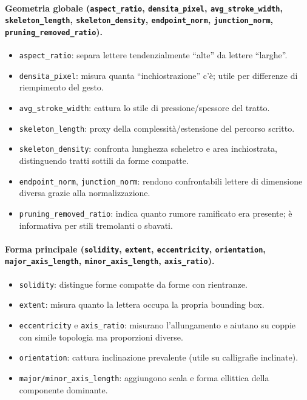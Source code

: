 \documentclass[a4paper,12pt]{article}
\begin{document}
\paragraph{Geometria globale (\texttt{aspect\_ratio}, \texttt{densita\_pixel}, \texttt{avg\_stroke\_width}, \texttt{skeleton\_length}, \texttt{skeleton\_density}, \texttt{endpoint\_norm}, \texttt{junction\_norm}, \texttt{pruning\_removed\_ratio}).}
\begin{itemize}[leftmargin=1.5em]
  \item \texttt{aspect\_ratio}: separa lettere tendenzialmente ``alte'' da lettere ``larghe''.
  \item \texttt{densita\_pixel}: misura quanta ``inchiostrazione'' c'è; utile per differenze di riempimento del gesto.
  \item \texttt{avg\_stroke\_width}: cattura lo stile di pressione/spessore del tratto.
  \item \texttt{skeleton\_length}: proxy della complessità/estensione del percorso scritto.
  \item \texttt{skeleton\_density}: confronta lunghezza scheletro e area inchiostrata, distinguendo tratti sottili da forme compatte.
  \item \texttt{endpoint\_norm}, \texttt{junction\_norm}: rendono confrontabili lettere di dimensione diversa grazie alla normalizzazione.
  \item \texttt{pruning\_removed\_ratio}: indica quanto rumore ramificato era presente; è informativa per stili tremolanti o sbavati.
\end{itemize}

\paragraph{Forma principale (\texttt{solidity}, \texttt{extent}, \texttt{eccentricity}, \texttt{orientation}, \texttt{major\_axis\_length}, \texttt{minor\_axis\_length}, \texttt{axis\_ratio}).}
\begin{itemize}[leftmargin=1.5em]
  \item \texttt{solidity}: distingue forme compatte da forme con rientranze.
  \item \texttt{extent}: misura quanto la lettera occupa la propria bounding box.
  \item \texttt{eccentricity} e \texttt{axis\_ratio}: misurano l'allungamento e aiutano su coppie con simile topologia ma proporzioni diverse.
  \item \texttt{orientation}: cattura inclinazione prevalente (utile su calligrafie inclinate).
  \item \texttt{major/minor\_axis\_length}: aggiungono scala e forma ellittica della componente dominante.
\end{itemize}
\end{document}
